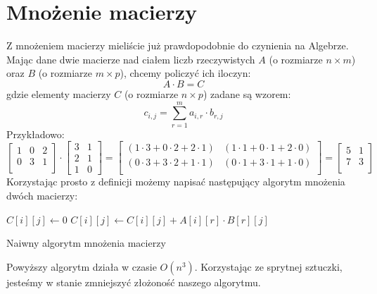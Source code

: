 \section{Mnożenie macierzy}

Z mnożeniem macierzy mieliście już prawdopodobnie do czynienia na Algebrze.
Mając dane dwie macierze nad ciałem liczb rzeczywistych $A$ (o rozmiarze $n \times m$) oraz $B$ (o rozmiarze $m \times p$), chcemy policzyć ich iloczyn:
\[
 A \cdot B = C
\]
gdzie elementy macierzy $C$ (o rozmiarze $n \times p$) zadane są wzorem:
\[
 c_{i,j} = \sum_{r=1}^{m} a_{i,r} \cdot b_{r,j}
\]
Przykładowo:
\[
  \begin{bmatrix}
    1 & 0 & 2 \\
    0 & 3 & 1 \\
  \end{bmatrix}
\cdot
  \begin{bmatrix}
    3 & 1 \\
    2 & 1 \\
    1 & 0
  \end{bmatrix}
=
  \begin{bmatrix}
     (1 \cdot 3  +  0 \cdot 2  +  2 \cdot 1) & (1 \cdot 1   +   0 \cdot 1   +   2 \cdot 0) \\
     (0 \cdot 3  +  3 \cdot 2  +  1 \cdot 1) & (0 \cdot 1   +   3 \cdot 1   +   1 \cdot 0) \\
  \end{bmatrix}
=
  \begin{bmatrix}
    5 & 1 \\
    7 & 3 \\
  \end{bmatrix}
\]
Korzystając prosto z definicji możemy napisać następujący algorytm mnożenia dwóch macierzy:

\begin{algorithm}[H]
  \DontPrintSemicolon
  
  
  
  {
     {
	$C[i][j] \leftarrow 0$\;
	{
	  $C[i][j] \leftarrow C[i][j] + A[i][r] \cdot B[r][j]$\;
	}
     }
  }
  
  \caption{Naiwny algorytm mnożenia macierzy}
  \label{alg-mnozenie-macierzy}
\end{algorithm}
Powyższy algorytm działa w czasie $O(n^3)$.
Korzystając ze sprytnej sztuczki, jesteśmy w stanie zmniejszyć złożoność naszego algorytmu.

